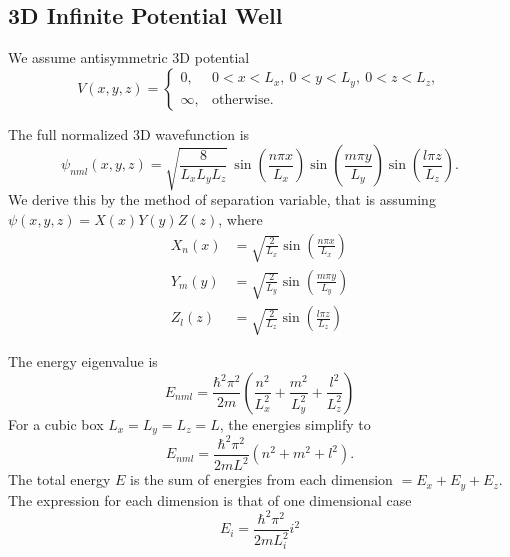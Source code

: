 \documentclass[../../../main.tex]{subfiles}
\begin{document}
\subsection{3D Infinite Potential Well}
We assume antisymmetric 3D potential
\begin{equation*}
    V(x,y,z) =
    \begin{cases}
        0,      & 0 < x < L_x, \ 0 < y < L_y, \ 0 < z < L_z, \\
        \infty, & \text{otherwise}.
    \end{cases}
\end{equation*}

The full normalized 3D wavefunction is
\begin{equation*}
    \psi_{nml}(x,y,z) = \sqrt{\frac{8}{L_x L_y L_z}} \,
    \sin\left(\frac{n \pi x}{L_x}\right)
    \sin\left(\frac{m \pi y}{L_y}\right)
    \sin\left(\frac{l \pi z}{L_z}\right).
\end{equation*}
We derive this by the method of separation variable, that is assuming $\psi(x,y,z) = X(x) Y(y) Z(z)$, where
\begin{align*}
    X_n(x) & = \sqrt{\frac{2}{L_x}} \sin\left(\frac{n \pi x}{L_x}\right) \\
    Y_m(y) & = \sqrt{\frac{2}{L_y}} \sin\left(\frac{m \pi y}{L_y}\right) \\
    Z_l(z) & = \sqrt{\frac{2}{L_z}} \sin\left(\frac{l \pi z}{L_z}\right)
\end{align*}

The energy eigenvalue is
\begin{equation*}
    E_{nml} =\frac{\hbar^2 \pi^2}{2 m} \left( \frac{n^2}{L_x^2} + \frac{m^2}{L_y^2} + \frac{l^2}{L_z^2} \right)
\end{equation*}
For a cubic box \(L_x = L_y = L_z = L\), the energies simplify to
\begin{equation*}
    E_{nml} = \frac{\hbar^2 \pi^2}{2 m L^2} (n^2 + m^2 + l^2).
\end{equation*}
The total energy $E$ is the sum of energies from each dimension $= E_x + E_y + E_z$.
The expression for each dimension is that of one dimensional case
\begin{equation*}
    E_i=\frac{\hbar^2 \pi^2 }{2mL_i^2}i^2
\end{equation*}
\end{document}
